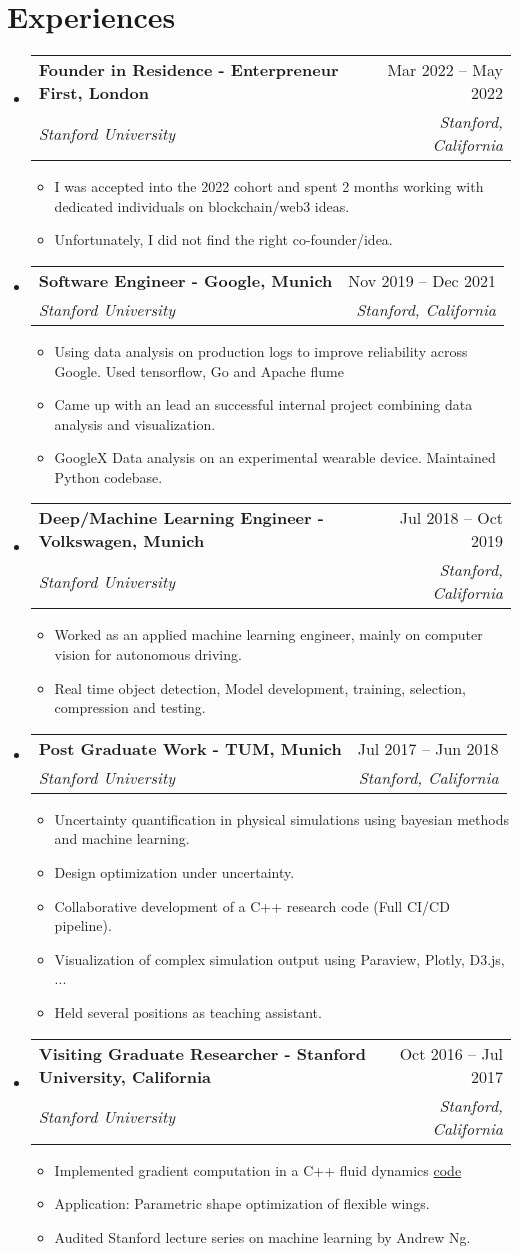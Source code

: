 \documentclass[letterpaper,11pt]{article}
\makeatletter
\newcommand{\resumeItem}[1]{
  \item\small{
    {#1 \vspace{-2pt}}
  }
}
\newcommand{\resumeSubheading}[4]{
  \vspace{-2pt}\item
    \begin{tabular*}{0.97\textwidth}[t]{l@{\extracolsep{\fill}}r}
      \textbf{#1} & #2 \\
      \textit{\small#3} & \textit{\small #4} \\
    \end{tabular*}\vspace{-7pt}
}
\newcommand{\resumeSubHeadingListStart}{\begin{itemize}[leftmargin=0.15in, label={}]}
\newcommand{\resumeSubHeadingListEnd}{\end{itemize}}
\newcommand{\resumeItemListStart}{\begin{itemize}}
\newcommand{\resumeItemListEnd}{\end{itemize}\vspace{-5pt}}
\makeatother
\begin{document}
\section{Experiences}
  \resumeSubHeadingListStart
    \resumeSubheading
      {Founder in Residence - Enterpreneur First, London}{Mar 2022 -- May 2022}
      {Stanford University}{Stanford, California}
    \resumeItemListStart
      \resumeItem{I was accepted into the 2022 cohort and spent 2 months working with dedicated individuals on blockchain/web3 ideas.}
      \resumeItem{Unfortunately, I did not find the right co-founder/idea.}
    \resumeItemListEnd
    \resumeSubheading
      {Software Engineer - Google, Munich}{Nov 2019 -- Dec 2021}
      {Stanford University}{Stanford, California}
    \resumeItemListStart
      \resumeItem{Using data analysis on production logs to improve reliability across Google. Used tensorflow, Go and Apache flume}
      \resumeItem{Came up with an lead an successful internal project combining data analysis and visualization.}
      \resumeItem{GoogleX Data analysis on an experimental wearable device. Maintained Python codebase.}
    \resumeItemListEnd
    \resumeSubheading
      {Deep/Machine Learning Engineer - Volkswagen, Munich}{Jul 2018 -- Oct 2019}
      {Stanford University}{Stanford, California}
    \resumeItemListStart
      \resumeItem{Worked as an applied machine learning engineer, mainly on computer vision for autonomous driving.}
      \resumeItem{Real time object detection, Model development, training, selection, compression and testing.}
    \resumeItemListEnd
    \resumeSubheading
      {Post Graduate Work - TUM, Munich}{Jul 2017 -- Jun 2018}
      {Stanford University}{Stanford, California}
    \resumeItemListStart
      \resumeItem{Uncertainty quantification in physical simulations using bayesian methods and machine learning.}
      \resumeItem{Design optimization under uncertainty.}
      \resumeItem{Collaborative development of a C++ research code (Full CI/CD pipeline).}
      \resumeItem{Visualization of complex simulation output using Paraview, Plotly, D3.js, ...}
      \resumeItem{Held several positions as teaching assistant.}
    \resumeItemListEnd
    \resumeSubheading
      {Visiting Graduate Researcher - Stanford University, California}{Oct 2016 -- Jul 2017}
      {Stanford University}{Stanford, California}
    \resumeItemListStart
      \resumeItem{Implemented gradient computation in a C++ fluid dynamics \href{https://bitbucket.org/frg/aero-f/src/master/}{code}}
      \resumeItem{Application: Parametric shape optimization of flexible wings.}
      \resumeItem{Audited Stanford lecture series on machine learning by Andrew Ng.}
    \resumeItemListEnd
  \resumeSubHeadingListEnd
\end{document}
